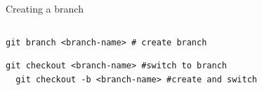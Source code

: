 \documentclass{beamer}
\begin{document}
\begin{frame}[fragile,t]{Creating a branch}\vspace{10pt}
  \begin{columns}
    \begin{column}{0.5\textwidth}
      \begin{lstlisting}[basicstyle=\ttfamily\tiny]
  git branch <branch-name> # create branch\end{lstlisting}\vspace{30pt}


      \begin{lstlisting}[basicstyle=\ttfamily\tiny]
  git checkout <branch-name> #switch to branch
  git checkout -b <branch-name> #create and switch \end{lstlisting}\vspace{10pt}
    \end{column}


\end{columns}
\end{frame}
\end{document}
